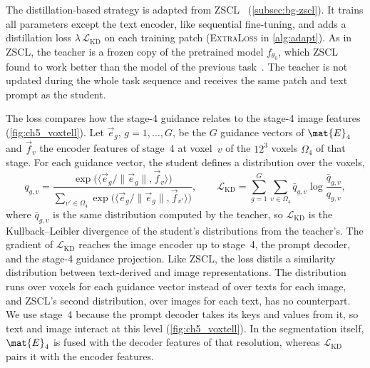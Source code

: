 The distillation-based strategy is adapted from ZSCL~\cite{zheng2023preventingzeroshottransferdegradation} (\cref{subsec:bg-zscl}).
It trains all parameters except the text encoder, like sequential fine-tuning, and adds a distillation loss $\lambda\,\mathcal{L}_{\mathrm{KD}}$ on each training patch (\textsc{ExtraLoss} in \cref{alg:adapt}).
As in ZSCL, the teacher is a frozen copy of the pretrained model $f_{\theta_0}$, which ZSCL found to work better than the model of the previous task~\cite[Table~1d]{zheng2023preventingzeroshottransferdegradation}.
The teacher is not updated during the whole task sequence and receives the same patch and text prompt as the student.

The loss compares how the stage-4 guidance relates to the stage-4 image features (\cref{fig:ch5_voxtell}).
Let $\vec{e}_g$, $g = 1, \dots, G$, be the $G$ guidance vectors of $\mat{E}_4$ and $\vec{f}_v$ the encoder features of stage~4 at voxel~$v$ of the $12^3$ voxels $\Omega_4$ of that stage.
For each guidance vector, the student defines a distribution over the voxels,
\begin{equation}
q_{g,v} = \frac{\exp\big(\langle \vec{e}_g / \|\vec{e}_g\|, \vec{f}_v \rangle\big)}{\sum_{v' \in \Omega_4} \exp\big(\langle \vec{e}_g / \|\vec{e}_g\|, \vec{f}_{v'} \rangle\big)},
\qquad
\mathcal{L}_{\mathrm{KD}} = \sum_{g=1}^{G} \sum_{v \in \Omega_4} \bar{q}_{g,v} \log \frac{\bar{q}_{g,v}}{q_{g,v}},
\label{eq:method-kd}
\end{equation}
where $\bar{q}_{g,v}$ is the same distribution computed by the teacher, so $\mathcal{L}_{\mathrm{KD}}$ is the Kullback--Leibler divergence of the student's distributions from the teacher's.
The gradient of $\mathcal{L}_{\mathrm{KD}}$ reaches the image encoder up to stage~4, the prompt decoder, and the stage-4 guidance projection.
Like ZSCL, the loss distils a similarity distribution between text-derived and image representations.
The distribution runs over voxels for each guidance vector instead of over texts for each image, and ZSCL's second distribution, over images for each text, has no counterpart.
We use stage~4 because the prompt decoder takes its keys and values from it, so text and image interact at this level (\cref{fig:ch5_voxtell}).
In the segmentation itself, $\mat{E}_4$ is fused with the decoder features of that resolution, whereas $\mathcal{L}_{\mathrm{KD}}$ pairs it with the encoder features.

\begin{table}[tb]
\centering
\caption[Overview of the strategies]{Steps of \cref{alg:adapt} in which the six strategies differ. The column ``Added in training'' lists what a strategy adds to the training of sequential fine-tuning: extra training data ($\textsc{ExtraData}_{\mathcal{S}}$), an extra loss term ($\textsc{ExtraLoss}_{\mathcal{S}}$), or a gradient factor $\xi_{\mathcal{S},t} \neq 1$. The parentheses give the number of trained parameters.  gives the number of parameters that sequential fine-tuning and the distillation-based strategy can update.}
\label{tab:method-strategies}

\end{table}

